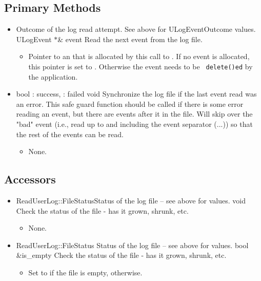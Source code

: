 \subsection{Primary Methods}
\begin{itemize}

\item {}
  {}
  {Outcome of the log read attempt. See above for ULogEventOutcome
  values.}
  {ULogEvent $*$\& event}
  {Read the next event from the log file.}
  \begin{itemize}
  \item {}
    Pointer to an  that is allocated by this call to
    .
    If no event is allocated, this pointer is
    set to .  Otherwise the event needs to be {\tt
    delete()ed} by the application.
  \end{itemize}

\item {}
  {bool} {: success, : failed}
  {void}
  {Synchronize the log file if the last event read was an error.  This
    safe guard function should be called if there is some error reading an
    event, but there are events after it in the file.  Will skip over the
    "bad" event (i.e., read up to and including the event separator (...))
    so that the rest of the events can be read.}
  \begin{itemize}\item None. \end{itemize}

\end{itemize}

\subsection{Accessors}
\begin{itemize}

\item {}
  {ReadUserLog::FileStatus}{Status of the log file -- see above for values.}
  {void}
  {Check the status of the file - has it grown, shrunk, etc.}
  \begin{itemize}\item None. \end{itemize}

\item {}
  {ReadUserLog::FileStatus} {Status of the log file -- see above for values.}
  {bool \&is\_empty}
  {Check the status of the file - has it grown, shrunk, etc.}
  \begin{itemize}
  \item {}
    Set to  if the file is empty,  otherwise.
  \end{itemize}

\end{itemize}


